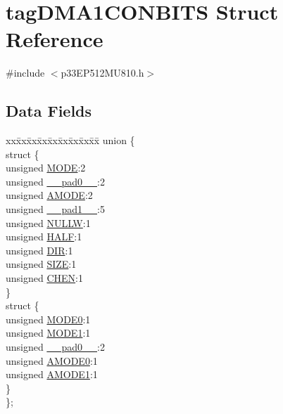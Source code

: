 \hypertarget{structtag_d_m_a1_c_o_n_b_i_t_s}{}\section{tag\+D\+M\+A1\+C\+O\+N\+B\+I\+TS Struct Reference}
\label{structtag_d_m_a1_c_o_n_b_i_t_s}


{\ttfamily \#include $<$p33\+E\+P512\+M\+U810.\+h$>$}

\subsection*{Data Fields}
\begin{DoxyCompactItemize}
\item 
\begin{tabbing}
xx\=xx\=xx\=xx\=xx\=xx\=xx\=xx\=xx\=\kill
union \{\\
\>struct \{\\
\>\>unsigned \hyperlink{structtag_d_m_a1_c_o_n_b_i_t_s_adc56ba18ff3f1599c85d222bee624424}{MODE}:2\\
\>\>unsigned \hyperlink{structtag_d_m_a1_c_o_n_b_i_t_s_adf71f3d8410c1f1dbbc96680a92c49af}{\_\_pad0\_\_}:2\\
\>\>unsigned \hyperlink{structtag_d_m_a1_c_o_n_b_i_t_s_ab3ff4e1f1b9a1037418ca7b6cb2e8f77}{AMODE}:2\\
\>\>unsigned \hyperlink{structtag_d_m_a1_c_o_n_b_i_t_s_acaf2d0924a107ec6e8d2e31febaf66f9}{\_\_pad1\_\_}:5\\
\>\>unsigned \hyperlink{structtag_d_m_a1_c_o_n_b_i_t_s_a1d3f7d04416314131889d1671a9287ad}{NULLW}:1\\
\>\>unsigned \hyperlink{structtag_d_m_a1_c_o_n_b_i_t_s_a1a715a64b2576f59401ac93d6f9a086a}{HALF}:1\\
\>\>unsigned \hyperlink{structtag_d_m_a1_c_o_n_b_i_t_s_ad6868749602045a76f36ffdf964dfd39}{DIR}:1\\
\>\>unsigned \hyperlink{structtag_d_m_a1_c_o_n_b_i_t_s_a5863cac6dc2cb330bdd0b1c66da70ffe}{SIZE}:1\\
\>\>unsigned \hyperlink{structtag_d_m_a1_c_o_n_b_i_t_s_a092934036fdfb8df5259db288fe438ca}{CHEN}:1\\
\>\} \\
\>struct \{\\
\>\>unsigned \hyperlink{structtag_d_m_a1_c_o_n_b_i_t_s_abc938903e74bff48935569d0c5b19035}{MODE0}:1\\
\>\>unsigned \hyperlink{structtag_d_m_a1_c_o_n_b_i_t_s_a7a9f7514566d0626724ce6c4b81b5ea2}{MODE1}:1\\
\>\>unsigned \hyperlink{structtag_d_m_a1_c_o_n_b_i_t_s_adf71f3d8410c1f1dbbc96680a92c49af}{\_\_pad0\_\_}:2\\
\>\>unsigned \hyperlink{structtag_d_m_a1_c_o_n_b_i_t_s_a0a1f894a2695c1388a5412244636805b}{AMODE0}:1\\
\>\>unsigned \hyperlink{structtag_d_m_a1_c_o_n_b_i_t_s_a3fde4abc0dc3db6fef6afc28c565ce3e}{AMODE1}:1\\
\>\} \\
\}; \\


\end{tabbing}
\end{DoxyCompactItemize}
